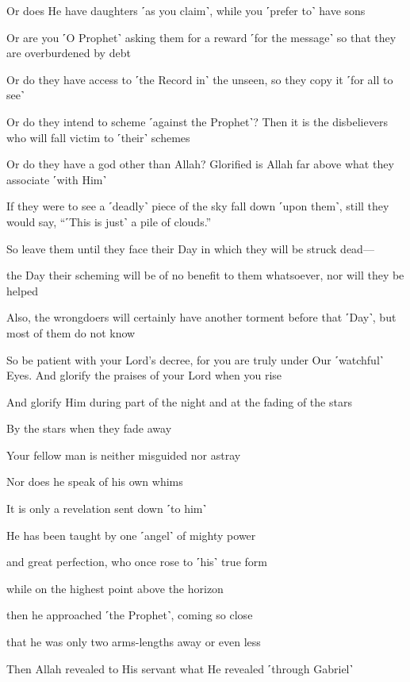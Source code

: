 Or does He have daughters ˹as you claim˺, while you ˹prefer to˺ have sons

Or are you ˹O Prophet˺ asking them for a reward ˹for the message˺ so that they are overburdened by debt

Or do they have access to ˹the Record in˺ the unseen, so they copy it ˹for all to see˺

Or do they intend to scheme ˹against the Prophet˺? Then it is the disbelievers who will fall victim to ˹their˺ schemes

Or do they have a god other than Allah? Glorified is Allah far above what they associate ˹with Him˺

If they were to see a ˹deadly˺ piece of the sky fall down ˹upon them˺, still they would say, “˹This is just˺ a pile of clouds.”

So leave them until they face their Day in which they will be struck dead—

the Day their scheming will be of no benefit to them whatsoever, nor will they be helped

Also, the wrongdoers will certainly have another torment before that ˹Day˺, but most of them do not know

So be patient with your Lord’s decree, for you are truly under Our ˹watchful˺ Eyes. And glorify the praises of your Lord when you rise

And glorify Him during part of the night and at the fading of the stars

By the stars when they fade away

Your fellow man is neither misguided nor astray

Nor does he speak of his own whims

It is only a revelation sent down ˹to him˺

He has been taught by one ˹angel˺ of mighty power

and great perfection, who once rose to ˹his˺ true form

while on the highest point above the horizon

then he approached ˹the Prophet˺, coming so close

that he was only two arms-lengths away or even less

Then Allah revealed to His servant what He revealed ˹through Gabriel˺

